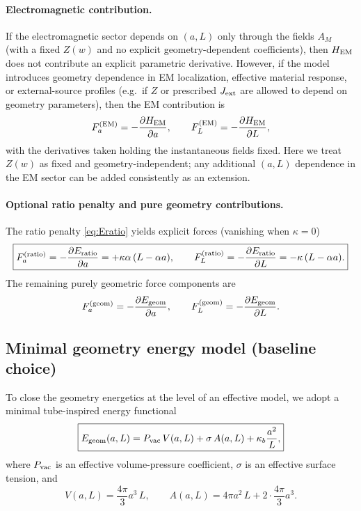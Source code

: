 \documentclass[11pt]{article}
\newcommand{\kappab}{\kappa_b}
\begin{document}
\paragraph{Electromagnetic contribution.}
If the electromagnetic sector depends on $(a,L)$ only through the fields $A_M$ (with a fixed $Z(w)$ and no explicit geometry-dependent coefficients), then $H_{\rm EM}$ does not contribute an explicit parametric derivative. However, if the model introduces geometry dependence in EM localization, effective material response, or external-source profiles (e.g.\ if $Z$ or prescribed $J_{\rm ext}$ are allowed to depend on geometry parameters), then the EM contribution is
\begin{equation}
F_a^{({\rm EM})}=-\frac{\partial H_{\rm EM}}{\partial a},
\qquad
F_L^{({\rm EM})}=-\frac{\partial H_{\rm EM}}{\partial L},
\end{equation}
with the derivatives taken holding the instantaneous fields fixed. Here we treat $Z(w)$ as fixed and geometry-independent; any additional $(a,L)$ dependence in the EM sector can be added consistently as an extension.

\paragraph{Optional ratio penalty and pure geometry contributions.}
The ratio penalty \eqref{eq:Eratio} yields explicit forces (vanishing when $\kappa=0$)
\begin{equation}
\boxed{
F_a^{({\rm ratio})} = -\frac{\partial E_{\rm ratio}}{\partial a}
=
+\kappa\alpha\,(L-\alpha a),
\qquad
F_L^{({\rm ratio})} = -\frac{\partial E_{\rm ratio}}{\partial L}
=
-\kappa\,(L-\alpha a).
}
\label{eq:ratio-forces}
\end{equation}
The remaining purely geometric force components are
\begin{equation}
F_a^{({\rm geom})}=-\frac{\partial E_{\rm geom}}{\partial a},
\qquad
F_L^{({\rm geom})}=-\frac{\partial E_{\rm geom}}{\partial L}.
\end{equation}

\subsection{Minimal geometry energy model (baseline choice)}
\label{sec:geometry-Egeom}

To close the geometry energetics at the level of an effective model, we adopt a minimal tube-inspired energy functional
\begin{equation}
\boxed{
E_{\rm geom}(a,L)=P_{\rm vac}\,V(a,L)+\sigma\,A(a,L)+\kappab\frac{a^2}{L},
}
\label{eq:Egeom}
\end{equation}
where $P_{\rm vac}$ is an effective volume-pressure coefficient, $\sigma$ is an effective surface tension, and
\begin{equation}
V(a,L)=\frac{4\pi}{3}a^3\,L,
\qquad
A(a,L)=4\pi a^2\,L + 2\cdot \frac{4\pi}{3}a^3.
\label{eq:VAdefs}
\end{equation}
\end{document}
